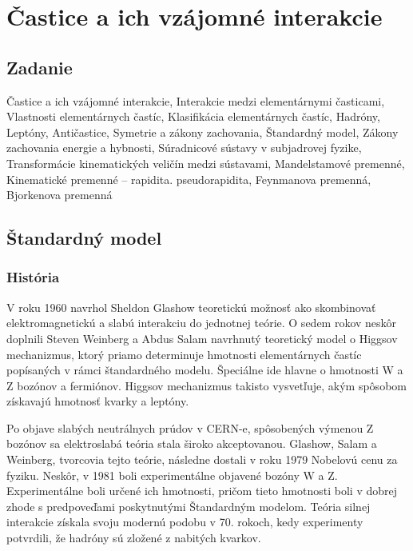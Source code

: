 \documentclass[../../main.tex]{subfiles}
\begin{document}
\chapter{Častice a ich vzájomné interakcie}
\section{Zadanie}
Častice a ich vzájomné interakcie, Interakcie medzi elementárnymi časticami, Vlastnosti elementárnych častíc, Klasifikácia elementárnych častíc, Hadróny, Leptóny, Antičastice, Symetrie a zákony zachovania, Štandardný model, Zákony zachovania energie a hybnosti, Súradnicové sústavy v subjadrovej fyzike, Transformácie kinematických veličín medzi sústavami, Mandelstamové premenné, Kinematické premenné – rapidita. pseudorapidita, Feynmanova premenná, Bjorkenova premenná

\section{Štandardný model}
\subsection{História}
V roku 1960 navrhol Sheldon Glashow teoretickú možnosť ako skombinovať elektromagnetickú a slabú interakciu do jednotnej teórie. O sedem rokov neskôr doplnili Steven Weinberg a Abdus Salam navrhnutý teoretický model o Higgsov mechanizmus, ktorý priamo determinuje hmotnosti elementárnych častíc popísaných v rámci štandardného modelu. Špeciálne ide hlavne o hmotnosti W a Z bozónov a fermiónov. Higgsov mechanizmus takisto vysvetľuje, akým spôsobom získavajú hmotnosť kvarky a leptóny.

Po objave slabých neutrálnych prúdov v CERN-e, spôsobených výmenou Z bozónov sa elektroslabá teória stala široko akceptovanou. Glashow, Salam a Weinberg, tvorcovia tejto teórie, následne dostali v roku 1979 Nobelovú cenu za fyziku. Neskôr, v 1981 boli experimentálne objavené bozóny W a Z. Experimentálne boli určené ich hmotnosti, pričom tieto hmotnosti boli v dobrej zhode s predpoveďami poskytnutými Štandardným modelom. Teória silnej interakcie získala svoju modernú podobu v 70. rokoch, kedy experimenty potvrdili, že hadróny sú zložené z nabitých kvarkov.
\end{document}
